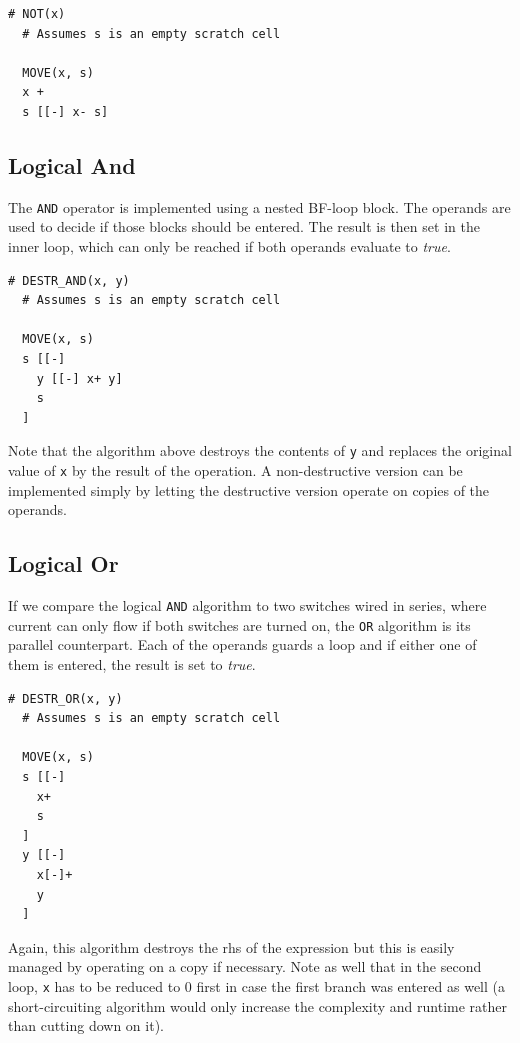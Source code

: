 \vspace{0.5cm}\noindent\begin{minipage}{\linewidth}
\begin{lstlisting}[style=brainfuck]
  # NOT(x)
  # Assumes s is an empty scratch cell
  
  MOVE(x, s)
  x +
  s [[-] x- s]
\end{lstlisting}
\end{minipage}

\subsection{Logical And}
\label{sec:compilation:logicaland}
The \texttt{AND} operator is implemented using a nested BF-loop block. The operands are used to decide if those blocks should be entered. The result is then set in the inner loop, which can only be reached if both operands evaluate to \emph{true}.

\vspace{0.5cm}\noindent\begin{minipage}{\linewidth}
\begin{lstlisting}[style=brainfuck]
  # DESTR_AND(x, y)
  # Assumes s is an empty scratch cell

  MOVE(x, s)
  s [[-]
    y [[-] x+ y]
    s
  ]
\end{lstlisting}
\end{minipage}
%
Note that the algorithm above destroys the contents of \texttt{y} and replaces the original value of \texttt{x} by the result of the operation. A non-destructive version can be implemented simply by letting the destructive version operate on copies of the operands.

\subsection{Logical Or}
\label{sec:compilation:logicalor}
If we compare the logical \texttt{AND} algorithm to two switches wired in series, where current can only flow if both switches are turned on, the \texttt{OR} algorithm is its parallel counterpart. Each of the operands guards a loop and if either one of them is entered, the result is set to \emph{true}.

\vspace{0.5cm}\noindent\begin{minipage}{\linewidth}
\begin{lstlisting}[style=brainfuck]
  # DESTR_OR(x, y)
  # Assumes s is an empty scratch cell
  
  MOVE(x, s)
  s [[-]
    x+
    s
  ]
  y [[-]
    x[-]+
    y
  ]
\end{lstlisting}
\end{minipage}
%
Again, this algorithm destroys the rhs of the expression but this is easily managed by operating on a copy if necessary. Note as well that in the second loop, \texttt{x} has to be reduced to 0 first in case the first branch was entered as well (a short-circuiting algorithm would only increase the complexity and runtime rather than cutting down on it).

